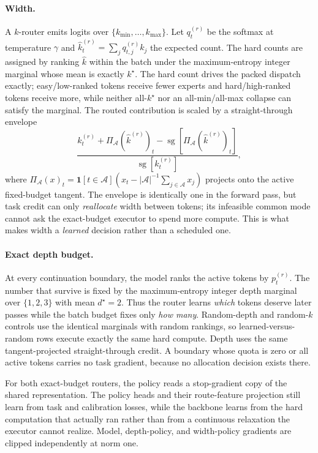 \documentclass[11pt]{article}
\newcommand{\kmax}{k_{\max}}
\begin{document}
\paragraph{Width.} A $k$-router emits logits over $\{k_{\min},\dots,\kmax\}$. Let
$q_t^{(r)}$ be the softmax at temperature $\gamma$ and
$\hat{k}_t^{(r)} = \sum_j q_{t,j}^{(r)} k_j$ the expected count. The hard counts
are assigned by ranking $\hat{k}$ within the batch under the maximum-entropy
integer marginal whose mean is exactly $k^\star$. The hard count drives the
packed dispatch exactly; easy/low-ranked tokens receive fewer experts and
hard/high-ranked tokens receive more, while neither all-$k^\star$ nor an
all-min/all-max collapse can satisfy the marginal. The routed
contribution is scaled by a straight-through envelope
\[
  \frac{k_t^{(r)} + \Pi_{\mathcal{A}}\!\left(\hat{k}^{(r)}\right)_t
  - \operatorname{sg}\!\left[\Pi_{\mathcal{A}}\!\left(\hat{k}^{(r)}\right)_t\right]}
  {\operatorname{sg}[k_t^{(r)}]},
\]
where $\Pi_{\mathcal{A}}(x)_t =
\mathbf{1}[t\in\mathcal{A}](x_t-\lvert\mathcal{A}\rvert^{-1}
\sum_{j\in\mathcal{A}}x_j)$ projects onto the active fixed-budget tangent.
The envelope is identically one in the forward pass, but task credit can only
\emph{reallocate} width between tokens; its infeasible common mode cannot ask
the exact-budget executor to spend more compute. This is what makes width a
\emph{learned} decision rather than a scheduled one.

\paragraph{Exact depth budget.} At every continuation boundary, the model ranks
the active tokens by $p_t^{(r)}$. The number that survive is fixed by the
maximum-entropy integer depth marginal over $\{1,2,3\}$ with mean
$d^\star=2$. Thus the router
learns \emph{which} tokens deserve later passes while the batch budget fixes
only \emph{how many}. Random-depth and random-$k$ controls use the identical
marginals with random rankings, so learned-versus-random rows execute exactly
the same hard compute. Depth uses the same tangent-projected straight-through
credit. A boundary whose quota is zero or all active tokens carries no task
gradient, because no allocation decision exists there.

For both exact-budget routers, the policy reads a stop-gradient copy of the
shared representation. The policy heads and their route-feature projection
still learn from task and calibration losses, while the backbone learns from
the hard computation that actually ran rather than from a continuous
relaxation the executor cannot realize. Model, depth-policy, and width-policy
gradients are clipped independently at norm one.
\end{document}
